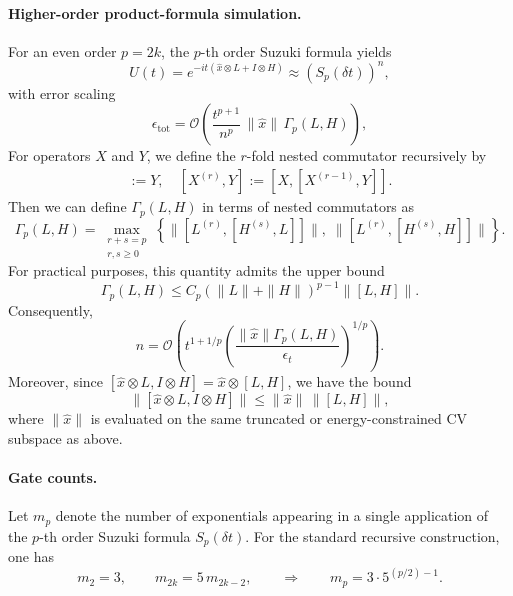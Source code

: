\documentclass{article}
\begin{document}
\paragraph{Higher-order product-formula simulation.}
For an even order $p=2k$, the $p$-th order Suzuki formula yields
\begin{equation}
    U(t)
    =
    e^{-it(\hat{x}\otimes L+I\otimes H)}
    \approx
    \left(S_p(\delta t)\right)^n,
\end{equation}
with error scaling
\begin{equation}
    \epsilon_{\mathrm{tot}}
    =
    \mathcal{O}\!\left(
    \frac{t^{p+1}}{n^p}\,
    \|\hat x\|\,
    \Gamma_p( L, H)
    \right),
\end{equation}
For operators $X$ and $Y$, we define the $r$-fold nested commutator recursively by
\begin{align}
    [X^{(0)},Y] := Y, \quad
    [X^{(r)},Y] := [X,[X^{(r-1)},Y]].
\end{align}
Then we can define $\Gamma_p( L, H)$ in terms of nested commutators as
\begin{equation}
    \Gamma_p( L, H)
    =
    \max_{\substack{r+s=p\\ r,s\ge 0}}
    \left\{
    \bigl\|[ L^{(r)},[ H^{(s)}, L]]\bigr\|,
    \;
    \bigl\|[ L^{(r)},[ H^{(s)}, H]]\bigr\|
    \right\}.
\end{equation}
For practical purposes, this quantity admits the upper bound
\begin{equation}
    \Gamma_p( L, H)
    \le
    C_p(\| L\|+\| H\|)^{p-1}\|[ L, H]\|.
\end{equation}
Consequently,
\begin{equation}
    n = \mathcal{O}\!\left(t^{1+1/p} \left(\frac{\|\hat x\|\Gamma_p( L, H)}{\epsilon_t}\right)^{1/p}\right).
\end{equation}
Moreover, since $[\hat{x}\otimes L, I\otimes H] = \hat{x}\otimes[ L, H]$, we have the bound
\begin{equation}
    \|[\hat{x}\otimes L, I\otimes H]\|
    \le
    \|\hat{x}\|\,\|[ L, H]\|,
\end{equation}
where $\|\hat x\|$ is evaluated on the same truncated or energy-constrained CV subspace as above.







\paragraph{Gate counts.}
Let $m_p$ denote the number of exponentials appearing in a single application of the $p$-th order Suzuki formula $S_p(\delta t)$.
For the standard recursive construction, one has
\begin{equation}
    m_{2}=3,
    \qquad
    m_{2k}=5\,m_{2k-2},
    \qquad
    \Rightarrow\qquad
    m_{p}=3\cdot 5^{(p/2)-1}.
\end{equation}
\end{document}
